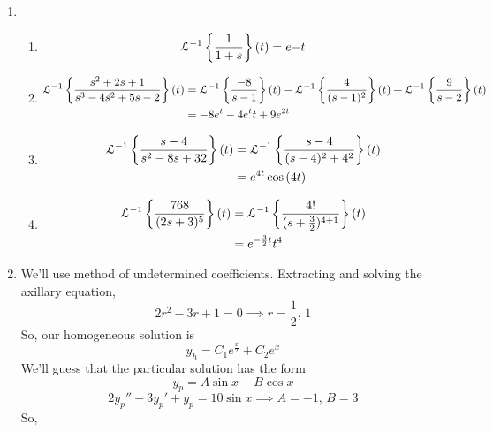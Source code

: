 \begin{enumerate}[label=\arabic*.]
\begin{enumerate}[label = (\alph*)]
		\end{enumerate}
	\item
		\begin{enumerate}[label=(\alph*)]
			\item 
				\begin{equation*}
					\mathcal{L}^{-1}\left\{ \frac{1}{1+s} \right\}\left(t\right) = e{-t}
				\end{equation*}
			\item
				\begin{align*}
					\mathcal{L}^{-1}\left\{ \frac{s^2+2s+1}{s^3-4s^2+5s-2} \right\}\left(t\right) &= \mathcal{L}^{-1}\left\{ \frac{-8}{s-1} \right\}\left(t\right)-\mathcal{L}^{-1}\left\{ \frac{4}{(s-1)^2} \right\}\left(t\right)+\mathcal{L}^{-1}\left\{ \frac{9}{s-2} \right\}\left(t\right) \\
					&= -8e^{t} - 4e^{t}t + 9e^{2t}
				\end{align*}
			\item
				\begin{align*}
					\mathcal{L}^{-1}\left\{ \frac{s-4}{s^2-8s+32} \right\}\left(t\right) &= \mathcal{L}^{-1}\left\{ \frac{s-4}{(s-4)^2 + 4^2} \right\}\left(t\right) \\
					&= e^{4t}\cos{(4t)}
				\end{align*}
			\item
				\begin{align*}
					\mathcal{L}^{-1}\left\{ \frac{768}{(2s+3)^5} \right\}\left(t\right) &= \mathcal{L}^{-1}\left\{ \frac{4!}{(s+\frac{3}{2})^{4+1}} \right\}\left(t\right) \\
					&= e^{-\frac{3}{2}t}t^4
				\end{align*}
		\end{enumerate}
	\item
		We'll use method of undetermined coefficients. Extracting and solving the axillary equation,
		\begin{equation*}
			2r^2 - 3r + 1 = 0 \implies r = \frac{1}{2} \text{, } 1
		\end{equation*}
		So, our homogeneous solution is
		\begin{equation*}
			y_h = C_1e^{\frac{x}{2}} + C_2e^{x}
		\end{equation*}
		We'll guess that the particular solution has the form
		\begin{equation*}
			y_p = A\sin{x} + B\cos{x}
		\end{equation*}
		\begin{equation*}
			2y_p'' - 3y_p' + y_p = 10\sin{x} \implies A = -1 \text{, } B = 3 
		\end{equation*}
		So,
		\begin{equation*}

\end{equation*}
\end{enumerate}
